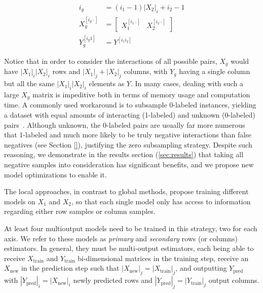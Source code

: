 \documentclass[conference]{IEEEtran}
\newcommand{\el}[1]{^{[#1]}}
\newcommand{\concat}{+\!\!\!+}
\begin{document}
%
\begin{equation}
    \begin{split}
    i_g &= (i_1-1)|X_2|_i+i_2-1\\
    X_g \el{i_g\cdot} &= \begin{bmatrix} X_1 \el{i_1\cdot} & X_2\el{i_2\cdot}\end{bmatrix}\\
    Y_g \el{i_g1} &= Y\el{i_1i_2}
    \end{split}
    \label{eq:gsodata}
\end{equation}

Notice that in order to consider the interactions of all possible pairs, $X_g$ would have $|X_1|_i|X_2|_i$ rows and $|X_1|_j+|X_2|_j$ columns, with $Y_g$ having a single column but all the same $|X_1|_i|X_2|_i$ elements as $Y$. 
In many cases, dealing with such a large $X_g$ matrix is impeditive both in terms of memory usage and computation time. A commonly used workaround is to subsample 0-labeled instances, yielding a dataset with equal amounts of interacting (1-labeled) and unknown (0-labeled) pairs~\cite{}. Although unknown, the 0-labeled pairs are usually far more numerous that 1-labeled and much more likely to be truly negative interactions than false negatives (see Section \ref{}), justifying the zero subsampling strategy. Despite such reasoning, we demonstrate in the results section (\ref{sec:results}) that taking all negative samples into consideration has significant benefits, and we propose new model optimizations to enable it.

The local approaches, in contrast to global methods, propose training different models on $X_1$ and $X_2$, so that each single model only has access to information regarding either row samples or column samples.

At least four multioutput models need to be trained in this strategy, two for each axis. We refer to these models as \emph{primary} and \emph{secondary} rows (or columns) estimators. In general, they must be multi-output estimators, each being able to receive $X_\text{train}$ and $Y_\text{train}$ bi-dimensional matrices in the training step, receive an $X_\text{new}$ in the prediction step such that $|X_\text{new}|_j=|X_\text{train}|_j$, and outputting $Y_\text{pred}$ with $|Y_\text{pred}|_i=|X_\text{new}|_i$ newly predicted rows and $|Y_\text{pred}|_j = |Y_\text{train}|_j$ output columns.
\end{document}
